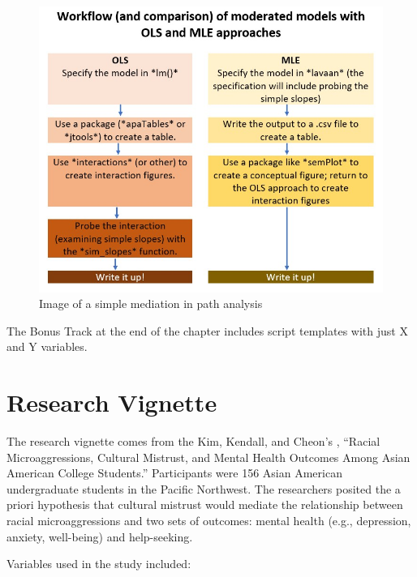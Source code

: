 \documentclass[
  11pt,
]{book}
\begin{document}
\begin{figure}
\centering
\includegraphics{images/SimpleMod/OLS_MLEwrkflow.jpg}
\caption{Image of a simple mediation in path analysis}
\end{figure}

The Bonus Track at the end of the chapter includes script templates with just X and Y variables.

\hypertarget{research-vignette-6}{%
\section{Research Vignette}\label{research-vignette-6}}

The research vignette comes from the Kim, Kendall, and Cheon's \citeyearpar{kim_racial_2017}, ``Racial Microaggressions, Cultural Mistrust, and Mental Health Outcomes Among Asian American College Students.'' Participants were 156 Asian American undergraduate students in the Pacific Northwest. The researchers posited the a priori hypothesis that cultural mistrust would mediate the relationship between racial microaggressions and two sets of outcomes: mental health (e.g., depression, anxiety, well-being) and help-seeking.

Variables used in the study included:
\end{document}
